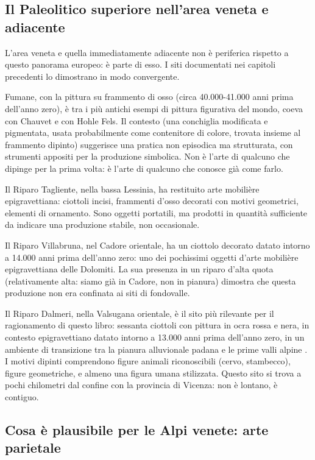 \subsection{Il Paleolitico superiore nell'area veneta e adiacente}

L'area veneta e quella immediatamente adiacente non è periferica rispetto a questo panorama europeo: è parte di esso. I siti documentati nei capitoli precedenti lo dimostrano in modo convergente.

Fumane, con la pittura su frammento di osso (circa 40.000-41.000 anni prima dell'anno zero), è tra i più antichi esempi di pittura figurativa del mondo, coeva con Chauvet e con Hohle Fels. Il contesto (una conchiglia modificata e pigmentata, usata probabilmente come contenitore di colore, trovata insieme al frammento dipinto) suggerisce una pratica non episodica ma strutturata, con strumenti appositi per la produzione simbolica. Non è l'arte di qualcuno che dipinge per la prima volta: è l'arte di qualcuno che conosce già come farlo.

Il Riparo Tagliente, nella bassa Lessinia, ha restituito arte mobilière epigravettiana: ciottoli incisi, frammenti d'osso decorati con motivi geometrici, elementi di ornamento. Sono oggetti portatili, ma prodotti in quantità sufficiente da indicare una produzione stabile, non occasionale.

Il Riparo Villabruna, nel Cadore orientale, ha un ciottolo decorato datato intorno a 14.000 anni prima dell'anno zero: uno dei pochissimi oggetti d'arte mobilière epigravettiana delle Dolomiti. La sua presenza in un riparo d'alta quota (relativamente alta: siamo già in Cadore, non in pianura) dimostra che questa produzione non era confinata ai siti di fondovalle.

Il Riparo Dalmeri, nella Valsugana orientale, è il sito più rilevante per il ragionamento di questo libro: sessanta ciottoli con pittura in ocra rossa e nera, in contesto epigravettiano datato intorno a 13.000 anni prima dell'anno zero, in un ambiente di transizione tra la pianura alluvionale padana e le prime valli alpine \citep{dalmeri2002}. I motivi dipinti comprendono figure animali riconoscibili (cervo, stambecco), figure geometriche, e almeno una figura umana stilizzata. Questo sito si trova a pochi chilometri dal confine con la provincia di Vicenza: non è lontano, è contiguo.

\subsection{Cosa è plausibile per le Alpi venete: arte parietale}

